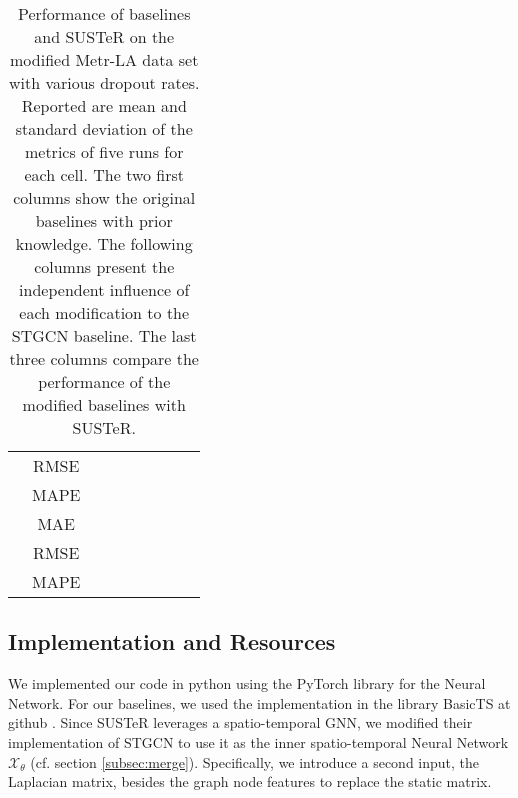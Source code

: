 \begin{table*}[h!]
\begin{tabular}{cc|rrrr|rrr}
        &RMSE&&&&&&&\\
        &MAPE&&&&&&&\\
        \hline
         &MAE&&&
&& & & \\
        &RMSE&&&&& &  & \\
        &MAPE&&&&& & & \\
        \hline
    \end{tabular}
    \caption{Performance of baselines and SUSTeR on the modified Metr-LA data set with various dropout rates. Reported are mean and standard deviation of the metrics of five runs for each cell. The two first columns show the original baselines with prior knowledge. The following columns present the independent influence of each modification to the STGCN baseline. The last three columns compare the performance of the modified baselines with SUSTeR.}
    \label{tab:baseline}
\end{table*}


\subsection{Implementation and Resources}
\label{subsec:impl}

We implemented our code in python using the PyTorch library \cite{paszke19} for the Neural Network.
For our baselines, we used the implementation in the library BasicTS at github \cite{liang23}.
Since SUSTeR leverages a spatio-temporal GNN, we modified their implementation of STGCN to use it as the inner spatio-temporal Neural Network $\mathcal{X}_{\theta}$ (cf. section \ref{subsec:merge}).
Specifically, we introduce a second input, the Laplacian matrix, besides the graph node features to replace the static matrix.


